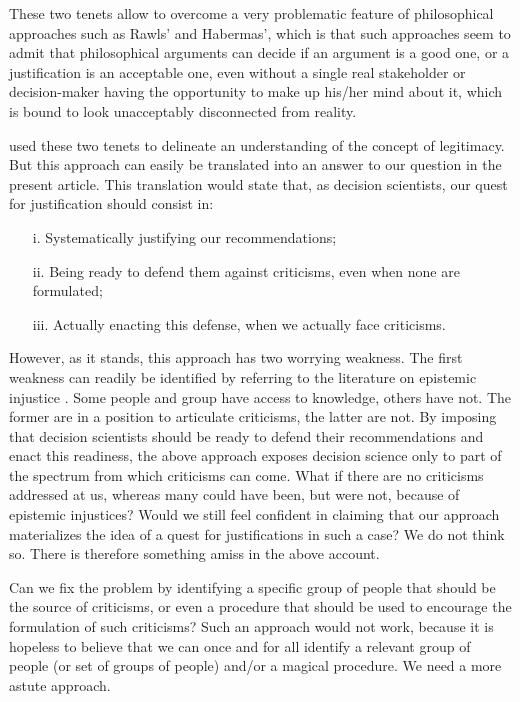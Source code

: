 \documentclass[preprint,11pt]{elsarticle}
\begin{document}
These two tenets allow to overcome a very problematic feature of philosophical approaches such as Rawls' and Habermas', which is that such approaches seem to admit that philosophical arguments can decide if an argument is a good one, or a justification is an acceptable one, even without a single real stakeholder or decision-maker having the opportunity to make up his/her mind about it, which is bound to look unacceptably disconnected from reality.

\cite{meinard_what_2017} used these two tenets to delineate an understanding of the concept of legitimacy. But this approach can easily be translated into an answer to our question in the present article. This translation would state that, as decision scientists, our quest for justification should consist in:
\begin{itemize}
\item[i.]	Systematically justifying our recommendations;
\item[ii.]	Being ready to defend them against criticisms, even when none are formulated;
\item[iii.]	Actually enacting this defense, when we actually face criticisms.
\end{itemize}
However, as it stands, this approach has two worrying weakness.
The first weakness can readily be identified by referring to the literature on epistemic injustice \cite{fricker_epistemic_2007}. Some people and group have access to knowledge, others have not. The former are in a position to articulate criticisms, the latter are not. By imposing that decision scientists should be ready to defend their recommendations and enact this readiness, the above approach exposes decision science only to part of the spectrum from which criticisms can come. What if there are no criticisms addressed at us, whereas many could have been, but were not, because of epistemic injustices? Would we still feel confident in claiming that our approach materializes the idea of a quest for justifications in such a case? We do not think so. There is therefore something amiss in the above account.


Can we fix the problem by identifying a specific group of people that should be the source of criticisms, or even a procedure that should be used to encourage the formulation of such criticisms? Such an approach would not work, because it is hopeless to believe that we can once and for all identify a relevant group of people (or set of groups of people) and/or a magical procedure. We need a more astute approach.
\end{document}
